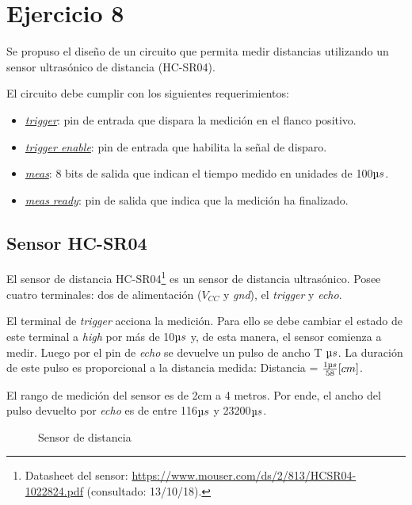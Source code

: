 \documentclass[../../e3_tp2_main.tex]{subfiles}
\begin{document}
\section{Ejercicio 8}

Se propuso el diseño de un circuito que permita medir distancias utilizando un sensor ultrasónico de distancia (HC-SR04).\par 

El circuito debe cumplir con los siguientes requerimientos: 
\begin{itemize}  
\item \underline{\textit{trigger}}: pin de entrada que dispara la medición en el flanco positivo. 
\item \underline{\textit{trigger enable}}: pin de entrada que habilita la señal de disparo.
\item \underline{\textit{meas}}: 8 bits de salida que indican el tiempo medido en unidades de 100$\micro s$.
\item \underline{\textit{meas ready}}: pin de salida que indica que la medición ha finalizado. 
\end{itemize}

\subsection{Sensor HC-SR04}

El sensor de distancia HC-SR04\footnote{Datasheet del sensor: \url{https://www.mouser.com/ds/2/813/HCSR04-1022824.pdf} (consultado: 13/10/18).} es un sensor de distancia ultrasónico. Posee cuatro terminales: dos de alimentación ($V_{CC}$ y \textit{gnd}), el \textit{trigger} y \textit{echo}.
\par El terminal de \textit{trigger} acciona la medición. Para ello se debe cambiar el estado de este terminal a \textit{high} por más de 10$\micro s$ y, de esta manera, el sensor comienza a medir. Luego por el pin de \textit{echo} se devuelve un pulso de ancho T $\micro s$. La duraci\'on de este pulso es proporcional a  la distancia medida: Distancia = $ \frac {1\micro s}{58}[cm]$.
\par El rango de medición del sensor es de 2cm a 4 metros. Por ende, el ancho del pulso devuelto por \textit{echo} es de entre 116$\micro s$ y 23200$\micro s$.
\begin{figure}[H]	
	\centering
	\caption{Sensor de distancia}
\end{figure}
\end{document}
